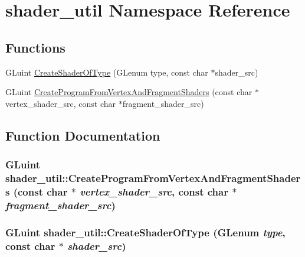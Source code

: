 \hypertarget{namespaceshader__util}{
\section{shader\_\-util Namespace Reference}
\label{namespaceshader__util}
}
\subsection*{Functions}
\begin{DoxyCompactItemize}
\item 
GLuint \hyperlink{namespaceshader__util_a7a7cb5f27fed3ac2e866d5ae0b260cdd}{CreateShaderOfType} (GLenum type, const char $\ast$shader\_\-src)
\item 
GLuint \hyperlink{namespaceshader__util_a2747dc87d29cef3d059d148f1f71d3c8}{CreateProgramFromVertexAndFragmentShaders} (const char $\ast$vertex\_\-shader\_\-src, const char $\ast$fragment\_\-shader\_\-src)
\end{DoxyCompactItemize}


\subsection{Function Documentation}
\hypertarget{namespaceshader__util_a2747dc87d29cef3d059d148f1f71d3c8}{
\subsubsection[{CreateProgramFromVertexAndFragmentShaders}]{\setlength{\rightskip}{0pt plus 5cm}GLuint shader\_\-util::CreateProgramFromVertexAndFragmentShaders (const char $\ast$ {\em vertex\_\-shader\_\-src}, \/  const char $\ast$ {\em fragment\_\-shader\_\-src})}}
\label{namespaceshader__util_a2747dc87d29cef3d059d148f1f71d3c8}
\hypertarget{namespaceshader__util_a7a7cb5f27fed3ac2e866d5ae0b260cdd}{
\subsubsection[{CreateShaderOfType}]{\setlength{\rightskip}{0pt plus 5cm}GLuint shader\_\-util::CreateShaderOfType (GLenum {\em type}, \/  const char $\ast$ {\em shader\_\-src})}}
\label{namespaceshader__util_a7a7cb5f27fed3ac2e866d5ae0b260cdd}
